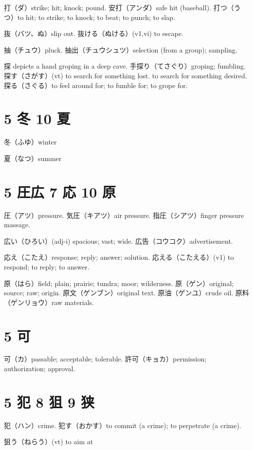 打（ダ）strike; hit; knock; pound.
安打（アンダ）safe hit (baseball).
打つ（うつ）to hit; to strike; to knock; to beat; to punch; to slap.

抜（バツ、ぬ）slip out.
抜ける（ぬける）(v1,vi) to escape.

抽（チュウ）pluck.
抽出（チュウシュツ）selection (from a group); sampling.

探 depicts a hand groping in a deep cave.
手探り（てさぐり）groping; fumbling.
探す（さがす）(vt)
to search for something lost.
to search for something desired.
探る（さぐる）to feel around for; to fumble for; to grope for.

\section{5 冬 10 夏}

冬（ふゆ）winter

夏（なつ）summer

\section{5 圧広 7 応 10 原}

圧（アツ）pressure.
気圧（キアツ）air pressure.
指圧（シアツ）finger pressure massage.

広い（ひろい）(adj-i) spacious; vast; wide.
広告（コウコク）advertisement.

応え（こたえ）response; reply; answer; solution.
応える（こたえる）(v1) to respond; to reply; to answer.

原（はら）field; plain; prairie; tundra; moor; wilderness.
原（ゲン）original; source; raw; origin.
原文（ゲンブン）original text.
原油（ゲンユ）crude oil.
原料（ゲンリョウ）raw materials.

\section{5 可}

可（カ）passable; acceptable; tolerable.
許可（キョカ）permission; authorization; approval.

\section{5 犯 8 狙 9 狭}

犯（ハン）crime.
犯す（おかす）to commit (a crime); to perpetrate (a crime).

狙う（ねらう）(vt) to aim at

